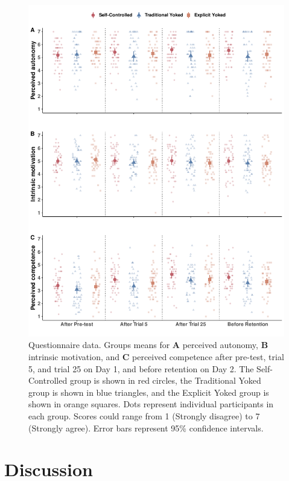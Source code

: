 \documentclass[
  english,
  jou]{apa7}
\begin{document}
\begin{figure}

{\centering \includegraphics[width=0.85\linewidth,height=0.85\textheight]{../../figs/fig2} 

}

\caption{Questionnaire data. Groups means for \textbf{A} perceived autonomy, \textbf{B} intrinsic motivation, and \textbf{C} perceived competence after pre-test, trial 5, and trial 25 on Day 1, and before retention on Day 2. The Self-Controlled group is shown in red circles, the Traditional Yoked group is shown in blue triangles, and the Explicit Yoked group is shown in orange squares. Dots represent individual participants in each group. Scores could range from 1 (Strongly disagree) to 7 (Strongly agree). Error bars represent 95\% confidence intervals.}\label{fig:fig2}
\end{figure}

\hypertarget{discussion}{%
\section{Discussion}\label{discussion}}
\end{document}
